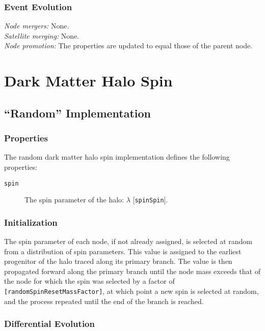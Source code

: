 \subsubsection{Event Evolution}

\noindent\emph{Node mergers:} None.\\

\noindent\emph{Satellite merging:} None.\\

\noindent\emph{Node promotion:} The properties are updated to equal those of the parent node.\\

\section{Dark Matter Halo Spin}\label{sec:DarkMatterHaloSpinComponent}

\subsection{``Random'' Implementation}

\subsubsection{Properties}

The random dark matter halo spin implementation defines the following properties:
\begin{description}
 \item [{\tt spin}] The spin parameter of the halo: $\lambda$ [{\tt spinSpin}].
\end{description}

\subsubsection{Initialization}

The spin parameter of each node, if not already assigned, is selected at random from a distribution of spin parameters. This value is assigned to the earliest progenitor of the halo traced along its primary branch. The value is then propagated forward along the primary branch until the \gls{node} mass exceeds that of the \gls{node} for which the spin was selected by a factor of {\tt [randomSpinResetMassFactor]}, at which point a new spin is selected at random, and the process repeated until the end of the branch is reached. 

\subsubsection{Differential Evolution}

